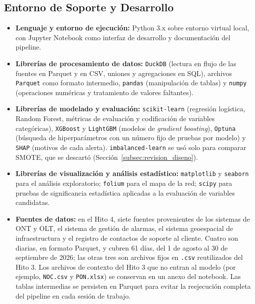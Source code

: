 \documentclass[12pt,a4paper]{article}
\begin{document}
\subsection{Entorno de Soporte y Desarrollo}
 
\begin{itemize}
    \item \textbf{Lenguaje y entorno de ejecución:} Python 3.x sobre entorno virtual local, con Jupyter Notebook como interfaz de desarrollo y documentación del pipeline.
 
    \item \textbf{Librerías de procesamiento de datos:} \texttt{DuckDB} (lectura en flujo de las fuentes en Parquet y en CSV, uniones y agregaciones en SQL), archivos \texttt{Parquet} como formato intermedio, \texttt{pandas} (manipulación de tablas) y \texttt{numpy} (operaciones numéricas y tratamiento de valores faltantes).

    \item \textbf{Librerías de modelado y evaluación:} \texttt{scikit-learn} (regresión logística, Random Forest, métricas de evaluación y codificación de variables categóricas), \texttt{XGBoost} y \texttt{LightGBM} (modelos de \textit{gradient boosting}), \texttt{Optuna} (búsqueda de hiperparámetros con un número fijo de pruebas por modelo) y \texttt{SHAP} (motivos de cada alerta). \texttt{imbalanced-learn} se usó solo para comparar SMOTE, que se descartó (Sección~\ref{subsec:revision_diseno}).

    \item \textbf{Librerías de visualización y análisis estadístico:} \texttt{matplotlib} y \texttt{seaborn} para el análisis exploratorio; \texttt{folium} para el mapa de la red; \texttt{scipy} para pruebas de significancia estadística aplicadas a la evaluación de variables candidatas.

    \item \textbf{Fuentes de datos:} en el Hito 4, siete fuentes provenientes de los sistemas de ONT y OLT, el sistema de gestión de alarmas, el sistema geoespacial de infraestructura y el registro de contactos de soporte al cliente. Cuatro son diarias, en formato Parquet, y cubren 61 días, del 1 de agosto al 30 de septiembre de 2026; las otras tres son archivos fijos en \texttt{.csv} reutilizados del Hito 3. Los archivos de contexto del Hito 3 que no entran al modelo (por ejemplo, \texttt{NOC.csv} y \texttt{PON.xlsx}) se conservan en un anexo del notebook. Las tablas intermedias se persisten en Parquet para evitar la reejecución completa del pipeline en cada sesión de trabajo.


\end{itemize}
\end{document}
